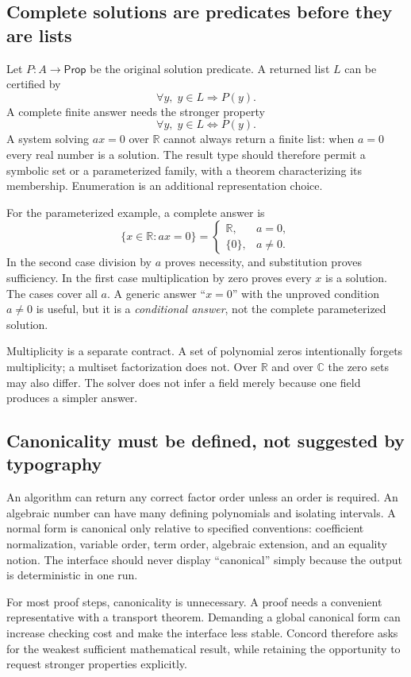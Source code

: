 \documentclass[11pt,a4paper]{article}
\newcommand{\R}{\mathbb R}
\newcommand{\C}{\mathbb C}
\theoremstyle{remark}
\begin{document}
\subsection{Complete solutions are predicates before they are lists}
Let $P:A\to\mathsf{Prop}$ be the original solution predicate. A returned list $L$
can be certified by
\[
 \forall y,\;y\in L\Longrightarrow P(y).
\]
A complete finite answer needs the stronger property
\[
 \forall y,\;y\in L\Longleftrightarrow P(y).
\]
A system solving $a x=0$ over $\R$ cannot always return a finite list: when $a=0$
every real number is a solution. The result type should therefore permit a
symbolic set or a parameterized family, with a theorem characterizing its
membership. Enumeration is an additional representation choice.

For the parameterized example, a complete answer is
\[
 \{x\in\R:ax=0\}=
 \begin{cases}
   \R,&a=0,\\
   \{0\},&a\ne0.
 \end{cases}
\]
In the second case division by $a$ proves necessity, and substitution proves
sufficiency. In the first case multiplication by zero proves every $x$ is a
solution. The cases cover all $a$. A generic answer ``$x=0$'' with the unproved
condition $a\ne0$ is useful, but it is a \emph{conditional answer}, not the
complete parameterized solution.

Multiplicity is a separate contract. A set of polynomial zeros intentionally
forgets multiplicity; a multiset factorization does not. Over $\R$ and over $\C$
the zero sets may also differ. The solver does not infer a field merely because
one field produces a simpler answer.

\subsection{Canonicality must be defined, not suggested by typography}
An algorithm can return any correct factor order unless an order is required.
An algebraic number can have many defining polynomials and isolating intervals.
A normal form is canonical only relative to specified conventions: coefficient
normalization, variable order, term order, algebraic extension, and an equality
notion. The interface should never display ``canonical'' simply because the
output is deterministic in one run.

For most proof steps, canonicality is unnecessary. A proof needs a convenient
representative with a transport theorem. Demanding a global canonical form can
increase checking cost and make the interface less stable. Concord therefore
asks for the weakest sufficient mathematical result, while retaining the
opportunity to request stronger properties explicitly.
\end{document}
